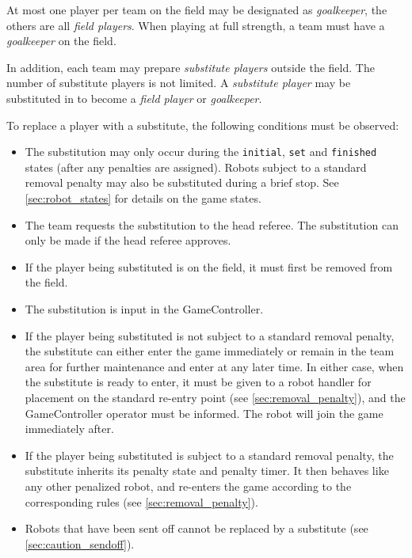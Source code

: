 At most one player per team on the field may be designated as \emph{goalkeeper}, the others are all \emph{field players}.
When playing at full strength, a team must have a \emph{goalkeeper} on the field.

\label{sec:number_of_substitutes}
In addition, each team may prepare \emph{substitute players} outside the field. The number of substitute players is not limited.
A \emph{substitute player} may be substituted in to become a \emph{field player} or \emph{goalkeeper}.

\label{sec:substitution_procedure}

To replace a player with a substitute, the following conditions must be observed:
\begin{itemize}
  \item The substitution may only occur during the \texttt{initial}, \texttt{set} and \texttt{finished} states (after any penalties are assigned). Robots subject to a standard removal penalty may also be substituted during a brief stop. See \cref{sec:robot_states} for details on the game states.
  \item The team requests the substitution to the head referee. The substitution can only be made if the head referee approves.
  \item If the player being substituted is on the field, it must first be removed from the field.
  \item The substitution is input in the GameController.
  \item If the player being substituted is not subject to a standard removal penalty, the substitute can either enter the game immediately or remain in the team area for further maintenance and enter at any later time. In either case, when the substitute is ready to enter, it must be given to a robot handler for placement on the standard re-entry point (see \cref{sec:removal_penalty}), and the GameController operator must be informed. The robot will join the game immediately after.
  \item If the player being substituted is subject to a standard removal penalty, the substitute inherits its penalty state and penalty timer. It then behaves like any other penalized robot, and re-enters the game according to the corresponding rules (see \cref{sec:removal_penalty}).
  \item Robots that have been sent off cannot be replaced by a substitute (see \cref{sec:caution_sendoff}).
\end{itemize}

